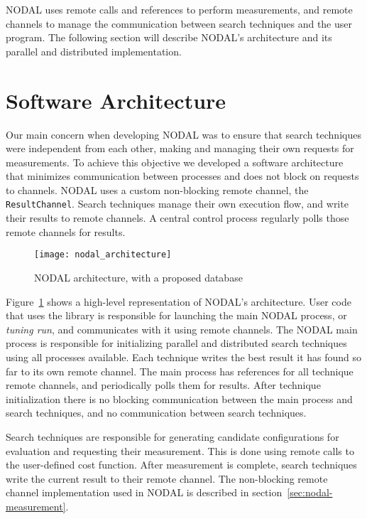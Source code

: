 NODAL uses remote calls and references to perform measurements, and remote
channels to manage the communication between search techniques and the user
program. The following section will describe NODAL's architecture and its
parallel and distributed implementation.

\section{Software Architecture}
\label{sec:nodal-arch}

Our main concern when developing NODAL was to ensure that search techniques
were independent from each other, making and managing their own requests for
measurements. To achieve this objective we developed a software architecture
that minimizes communication between processes and does not block on requests
to channels. NODAL uses a custom non-blocking remote channel, the
\texttt{ResultChannel}. Search techniques manage their own execution flow, and
write their results to remote channels. A central control process regularly
polls those remote channels for results.

\begin{figure}[htpb]
    \centering
    \texttt{[image: nodal\_architecture]}
    \caption{NODAL architecture, with a proposed database}
    \label{fig:nodal_architecture}
\end{figure}

Figure~\ref{fig:nodal_architecture} shows a high-level representation of
NODAL's architecture. User code that uses the library is responsible for
launching the main NODAL process, or \textit{tuning run}, and communicates with
it using remote channels. The NODAL main process is responsible for
initializing parallel and distributed search techniques using all processes
available. Each technique writes the best result it has found so far to its own
remote channel.  The main process has references for all technique remote
channels, and periodically polls them for results.  After technique
initialization there is no blocking communication between the main process and
search techniques, and no communication between search techniques.

Search techniques are responsible for generating candidate configurations for
evaluation and requesting their measurement. This is done using remote calls to
the user-defined cost function. After measurement is complete, search
techniques write the current result to their remote channel.  The non-blocking
remote channel implementation used in NODAL  is described in
section~\ref{sec:nodal-measurement}.

